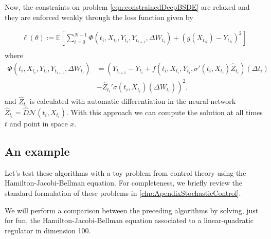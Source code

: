 Now, the constraints on problem \eqref{eqn:constrainedDeepBSDE} are relaxed and they are enforced weakly through the loss function given by

\begin{equation}
	\begin{gathered}
		\ell(\theta):=\mathbb{E}\left[\sum_{i=0}^{N-1} \Phi\left(t_i, X_{t_i}, Y_{t_i}, Y_{t_{i+1}}, \Delta W_{t_{i}}\right)+\left(g\left(X_{t_N}\right)-Y_{t_N}\right)^2\right] \\
	\end{gathered}
\end{equation}
where 
\begin{equation}
	\begin{split}
		\Phi\left(t_i, X_{t_i}, Y_{t_i}, Y_{t_{i+1}}, \Delta W_{t_i}\right)&=\left(Y_{t_{i+1}}-Y_{t_i}+f\left(t_i, X_{t_i}, Y_{t_i}, \sigma'\left(t_i, X_{t_i}\right) \widehat{Z}_{t_i}\right)\left(\Delta t_i\right)\right. \\
		&\left.-\widehat{Z}_{t_i}' \sigma\left(t_i, X_{t_i}\right)\left(\Delta W_{t_i}\right)\right)^2,
	\end{split}
\end{equation}
and $\widehat{Z}_{t_i}$ is calculated with automatic differentiation in the neural network $\widehat{Z}_{t_i}=\hat{D}\mathcal{N}(t_i,X_{t_i})$. With this approach we can compute the solution at all times $t$ and point in space $x$.
\subsection{An example}
Let's test these algorithms with a toy problem from control theory using the Hamilton-Jacobi-Bellman equation. For completeness, we briefly review the standard formulation of these problems in \autoref{chp:ApendixStochasticControl}.

We will perform a comparison between the preceding algorithms by solving, just for fun, the Hamilton-Jacobi-Bellman equation associated to a linear-quadratic regulator in dimension 100.

